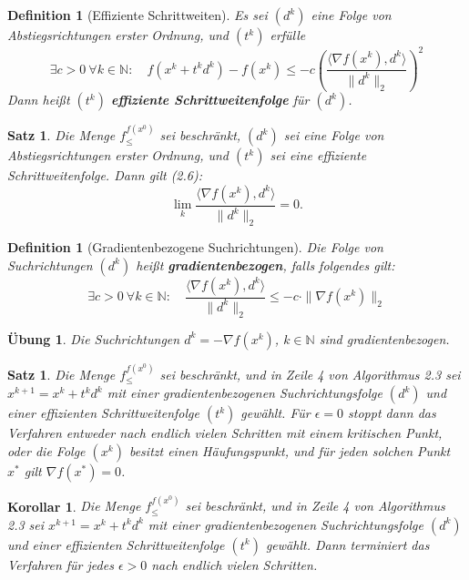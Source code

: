 \documentclass[11pt]{scrreprt}
\newcounter{thm}
\numberwithin{thm}{section}
\newtheorem{definition}[thm]{Definition}
\newtheorem{korollar}[thm]{Korollar}
\newtheorem{satz}[thm]{Satz}
\newtheorem{uebung}[thm]{Übung}
\begin{document}
\setcounter{thm}{4}

\begin{definition}[Effiziente Schrittweiten]
	Es sei $(d^k)$ eine Folge von Abstiegsrichtungen erster Ordnung, und $(t^k)$ erfülle
	$$ \exists c > 0 ~\forall k \in \mathbb{N}: \quad f(x^k+ t^k d^k) - f(x^k) \leq -c \left( \frac{\langle \nabla f(x^k) , d^k \rangle}{\| d^k \|_2} \right)^2 $$
	Dann heißt $(t^k)$ \textbf{effiziente Schrittweitenfolge} für $(d^k)$.
\end{definition}

\begin{satz}
	Die Menge $f_{\leq}^{f(x^0)}$ sei beschränkt, $(d^k)$ sei eine Folge von Abstiegsrichtungen erster Ordnung, und $(t^k)$ sei eine effiziente Schrittweitenfolge. Dann gilt (2.6):
	$$ \lim_{k} \frac{\langle \nabla f(x^k), d^k \rangle}{\| d^k \|_2}	= 0. $$
\end{satz}

\begin{definition}[Gradientenbezogene Suchrichtungen]
	Die Folge von Suchrichtungen $(d^k)$ heißt \textbf{gradientenbezogen}, falls folgendes gilt:
	$$ \exists c > 0 ~\forall k \in \mathbb{N}: \quad \frac{\langle \nabla f(x^k), d^k \rangle}{\| d^k \|_2} \leq - c \cdot \| \nabla f(x^k)\|_2 $$
\end{definition}

\begin{uebung}
	Die Suchrichtungen $d^k = - \nabla f(x^k)$, $k \in \mathbb{N}$ sind gradientenbezogen.
\end{uebung}

\begin{satz}
	Die Menge $f_{\leq}^{f(x^0)}$ sei beschränkt, und in Zeile 4 von Algorithmus 2.3 sei $x^{k+1} = x^k + t^k d^k$ mit einer gradientenbezogenen Suchrichtungsfolge $(d^k)$ und einer effizienten Schrittweitenfolge $(t^k)$ gewählt. Für $\epsilon = 0$ stoppt dann das Verfahren entweder nach endlich vielen Schritten mit einem kritischen Punkt, oder die Folge $(x^k )$ besitzt einen Häufungspunkt, und für jeden solchen Punkt $x^*$ gilt $\nabla f(x^*) = 0$.	
\end{satz}

\begin{korollar}
	Die Menge $f_{\leq}^{f(x^0)}$ sei beschränkt, und in Zeile 4 von Algorithmus 2.3 sei $x^{k+1} = x^k + t^k d^k$ mit einer gradientenbezogenen Suchrichtungsfolge $(d^k)$ und einer effizienten Schrittweitenfolge $(t^k)$ gewählt. Dann terminiert das Verfahren für jedes $\epsilon > 0$ nach endlich vielen Schritten.
\end{korollar}
\end{document}
